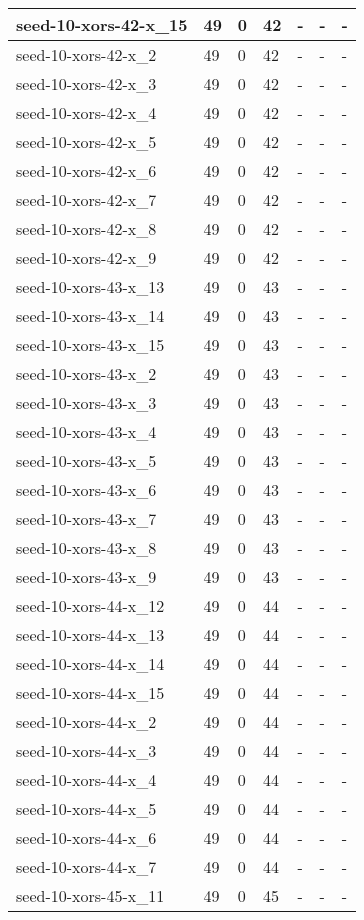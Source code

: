 \begin{scriptsize}
\begin{longtable}{|p{5cm}|l|l|l|l|l|l|}
seed-10-xors-42-x\_15&49&0&42&-&-&- \\ \hline 
seed-10-xors-42-x\_2&49&0&42&-&-&- \\ \hline 
seed-10-xors-42-x\_3&49&0&42&-&-&- \\ \hline 
seed-10-xors-42-x\_4&49&0&42&-&-&- \\ \hline 
seed-10-xors-42-x\_5&49&0&42&-&-&- \\ \hline 
seed-10-xors-42-x\_6&49&0&42&-&-&- \\ \hline 
seed-10-xors-42-x\_7&49&0&42&-&-&- \\ \hline 
seed-10-xors-42-x\_8&49&0&42&-&-&- \\ \hline 
seed-10-xors-42-x\_9&49&0&42&-&-&- \\ \hline 
seed-10-xors-43-x\_13&49&0&43&-&-&- \\ \hline 
seed-10-xors-43-x\_14&49&0&43&-&-&- \\ \hline 
seed-10-xors-43-x\_15&49&0&43&-&-&- \\ \hline 
seed-10-xors-43-x\_2&49&0&43&-&-&- \\ \hline 
seed-10-xors-43-x\_3&49&0&43&-&-&- \\ \hline 
seed-10-xors-43-x\_4&49&0&43&-&-&- \\ \hline 
seed-10-xors-43-x\_5&49&0&43&-&-&- \\ \hline 
seed-10-xors-43-x\_6&49&0&43&-&-&- \\ \hline 
seed-10-xors-43-x\_7&49&0&43&-&-&- \\ \hline 
seed-10-xors-43-x\_8&49&0&43&-&-&- \\ \hline 
seed-10-xors-43-x\_9&49&0&43&-&-&- \\ \hline 
seed-10-xors-44-x\_12&49&0&44&-&-&- \\ \hline 
seed-10-xors-44-x\_13&49&0&44&-&-&- \\ \hline 
seed-10-xors-44-x\_14&49&0&44&-&-&- \\ \hline 
seed-10-xors-44-x\_15&49&0&44&-&-&- \\ \hline 
seed-10-xors-44-x\_2&49&0&44&-&-&- \\ \hline 
seed-10-xors-44-x\_3&49&0&44&-&-&- \\ \hline 
seed-10-xors-44-x\_4&49&0&44&-&-&- \\ \hline 
seed-10-xors-44-x\_5&49&0&44&-&-&- \\ \hline 
seed-10-xors-44-x\_6&49&0&44&-&-&- \\ \hline 
seed-10-xors-44-x\_7&49&0&44&-&-&- \\ \hline 
seed-10-xors-45-x\_11&49&0&45&-&-&- \\ \hline 

\end{longtable}
\end{scriptsize}

